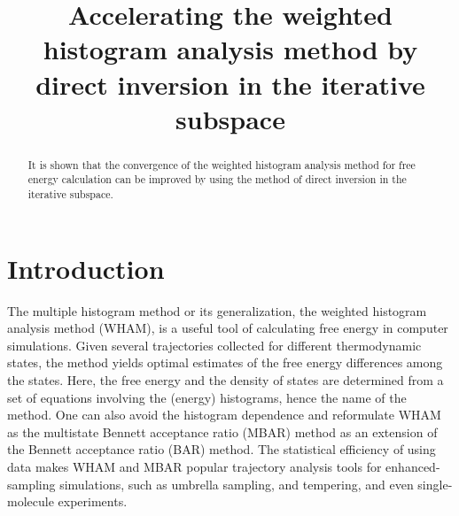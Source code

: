 \documentclass[reprint,superscriptaddress]{revtex4-1}
\begin{document}
\newcommand{\vct}[1]{\mathbf{#1}}
\newcommand{\vx}{\vct{x}}
\newcommand{\Z}{\mathcal{Z}}
\newcommand{\E}{\mathcal{E}}




\title{Accelerating the weighted histogram analysis method
by direct inversion in the iterative subspace}

\begin{abstract}
It is shown that the convergence of the weighted histogram analysis method for free energy calculation
can be improved by using the method of direct inversion in the iterative subspace.
\end{abstract}

\maketitle




\section{Introduction}





The multiple histogram method\cite{
ferrenberg1988, *ferrenberg1989}
or its generalization,
the weighted histogram analysis method (WHAM)\cite{
kumar1992, souaille2001, kastner2005,
chodera2007, bereau2009,
kim2011},
is a useful tool
of calculating free energy
in computer simulations\cite{
newman, *frenkel}.
%
Given several trajectories collected
for different thermodynamic states,
the method yields optimal estimates
of the free energy differences
among the states.
%
Here, the free energy
and the density of states
are determined
from a set of equations involving
the (energy) histograms,
hence the name of the method.
%
One can also avoid the histogram dependence
and reformulate WHAM
as the multistate Bennett acceptance ratio (MBAR) method\cite{
shirts2008}
as an extension of the Bennett acceptance ratio (BAR) method\cite{
bennett1976}.
%
The statistical efficiency of using data
makes WHAM and MBAR popular trajectory analysis tools
for enhanced-sampling simulations,
such as umbrella sampling\cite{
torrie1974, *laio2002},
and tempering\cite{
marinari1992, *lyubartsev1992,
swendsen1986, *geyer1991, *hukushima1996, *hansmann1997},
and even single-molecule experiments\cite{
shirts2008}.
\end{document}
